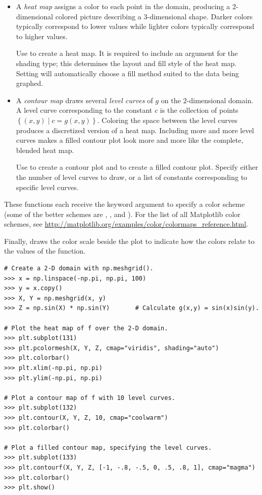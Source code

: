 \begin{itemize}
\item A \emph{heat map} assigns a color to each point in the domain, producing a 2-dimensional colored picture describing a 3-dimensional shape.
Darker colors typically correspond to lower values while lighter colors typically correspond to higher values.

Use  to create a heat map. It is required to include an argument for the shading type; this determines the layout and fill style of the heat map. Setting  will automatically choose a fill method suited to the data being graphed.

\item A \emph{contour map} draws several \emph{level curves} of $g$ on the $2$-dimensional domain.
A level curve corresponding to the constant $c$ is the collection of points $\left\{(x,y)\mid c = g(x,y)\right\}$.
Coloring the space between the level curves produces a discretized version of a heat map.
Including more and more level curves makes a filled contour plot look more and more like the complete, blended heat map.

Use  to create a contour plot and  to create a filled contour plot.
Specify either the number of level curves to draw, or a list of constants corresponding to specific level curves.
\end{itemize}

These functions each receive the keyword argument  to specify a color scheme (some of the better schemes are , , and ).
For the list of all Matplotlib color schemes, see \url{http://matplotlib.org/examples/color/colormaps_reference.html}.

Finally,  draws the color scale beside the plot to indicate how the colors relate to the values of the function.

\begin{lstlisting}
# Create a 2-D domain with np.meshgrid().
>>> x = np.linspace(-np.pi, np.pi, 100)
>>> y = x.copy()
>>> X, Y = np.meshgrid(x, y)
>>> Z = np.sin(X) * np.sin(Y)       # Calculate g(x,y) = sin(x)sin(y).

# Plot the heat map of f over the 2-D domain.
>>> plt.subplot(131)
>>> plt.pcolormesh(X, Y, Z, cmap="viridis", shading="auto")
>>> plt.colorbar()
>>> plt.xlim(-np.pi, np.pi)
>>> plt.ylim(-np.pi, np.pi)

# Plot a contour map of f with 10 level curves.
>>> plt.subplot(132)
>>> plt.contour(X, Y, Z, 10, cmap="coolwarm")
>>> plt.colorbar()

# Plot a filled contour map, specifying the level curves.
>>> plt.subplot(133)
>>> plt.contourf(X, Y, Z, [-1, -.8, -.5, 0, .5, .8, 1], cmap="magma")
>>> plt.colorbar()
>>> plt.show()
\end{lstlisting}

